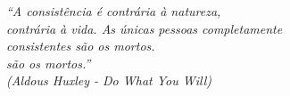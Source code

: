 \vspace*{\fill}
	\begin{flushright}
		\textit{``A consistência é contrária à natureza,
		\\ contrária à vida. As únicas pessoas completamente 
		\\ consistentes são os mortos.
        \\são os mortos.''\\
		(Aldous Huxley -  Do What You Will)}
	\end{flushright}
